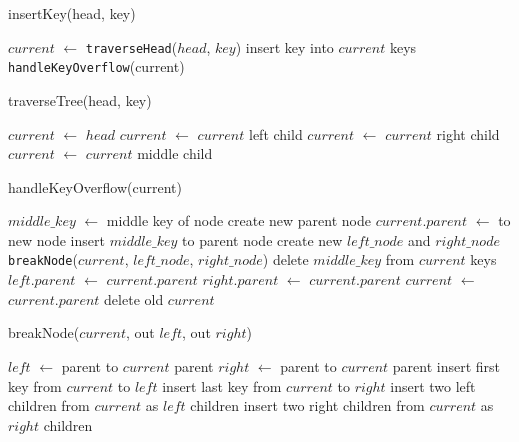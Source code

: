 \documentclass{article}
\begin{document}
\begin{function}
	\caption{insertKey(head, key)}
	\DontPrintSemicolon
	$current$ $\gets$ \texttt{traverseHead}($head$, $key$)\;
	insert key into $current$ keys\;
	\texttt{handleKeyOverflow}(current)\;
\end{function}

\begin{function}
	\caption{traverseTree(head, key)}
	\DontPrintSemicolon
	$current$ $\gets$ $head$\;
	{
		{
			$current$ $\gets$ $current$ left child\;
		}
		{
			$current$ $\gets$ $current$ right child\;
		}
		\Else
		{
			$current$ $\gets$ $current$ middle child\;
		}
	}
\end{function}

\begin{function}
	\caption{handleKeyOverflow(current)}
	\DontPrintSemicolon
	{
		$middle\_key$ $\gets$ middle key of node\;
		{
			create new parent node\;
			$current.parent$ $\gets$ to new node\;
		}
		insert $middle\_key$ to parent node\;
		create new $left\_node$ and $right\_node$\;
		\texttt{breakNode}($current$, $left\_node$, $right\_node$)\;
		delete $middle\_key$ from $current$ keys\;
		$left.parent$ $\gets$ $current.parent$\;
		$right.parent$ $\gets$ $current.parent$\;
		$current$ $\gets$ $current.parent$\;
		delete old $current$\;
	}
\end{function}

\begin{function}
	\caption{breakNode($current$, out $left$, out $right$)}
	\DontPrintSemicolon
	$left$ $\gets$ parent to $current$ parent\;
	$right$ $\gets$ parent to $current$ parent\;
	insert first key from $current$ to $left$\;
	insert last key from $current$ to $right$\;
	{
		insert two left children from $current$ as $left$ children\;
		insert two right children from $current$ as $right$ children\;
	}
\end{function}

\vspace*{4in}
\end{document}
